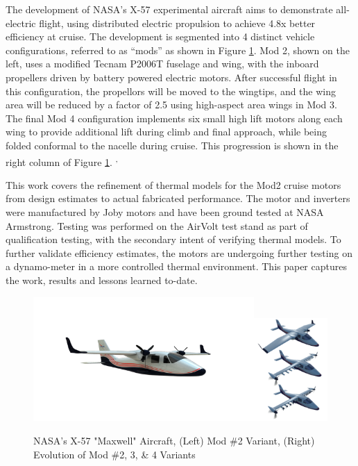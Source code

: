 \documentclass[]{aiaa-tc}%
\begin{document}
The development of NASA's X-57 experimental aircraft aims to demonstrate all-electric flight, using distributed electric propulsion to achieve 4.8x better efficiency at cruise. The development is segmented into 4 distinct vehicle configurations, referred to as ``mods'' as shown in Figure \ref{fig:Mod2Big}. Mod 2, shown on the left, uses a modified Tecnam P2006T fuselage and wing, with the inboard propellers driven by battery powered electric motors. After successful flight in this configuration, the propellors will be moved to the wingtips, and the wing area will be reduced by a factor of 2.5 using high-aspect area wings in Mod 3. The final Mod 4 configuration implements six small high lift motors along each wing to provide additional lift during climb and final approach, while being folded conformal to the nacelle during cruise. This progression is shown in the right column of Figure \ref{fig:Mod2Big}. \cite{falck_X57}\textsuperscript{,}\cite{Borer_2016}

This work covers the refinement of thermal models for the Mod2 cruise motors from design estimates to actual fabricated performance. The motor and inverters were manufactured by Joby motors and have been ground tested at NASA Armstrong. Testing was performed on the AirVolt test stand as part of qualification testing, with the secondary intent of verifying thermal models. To further validate efficiency estimates, the motors are undergoing further testing on a dynamo-meter in a more controlled thermal environment. This paper captures the work, results and lessons learned to-date.

\begin{figure}[!htb]%
	\centering
	\includegraphics[width=0.75\textwidth]{figures/X57_mod2.png}\includegraphics[width=0.25\textwidth]{figures/Mod234.png}
	\caption{NASA's X-57 "Maxwell" Aircraft, (Left) Mod \#2 Variant, (Right) Evolution of Mod \#2, 3, \& 4 Variants}
	\label{fig:Mod2Big}
\end{figure}
\end{document}
